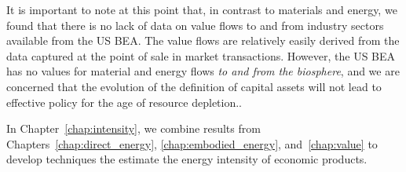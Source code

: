 It is important to note at this point that, in contrast to materials and energy,
we found that there is no lack of data on value flows
to and from industry sectors available 
from the US BEA. The value flows
are relatively easily derived from the 
data captured at the point of sale in market transactions. 
However, the US BEA has no values for material and energy flows 
\emph{to and from the biosphere}, and
we are concerned that the evolution of the definition of capital assets
will not lead to effective policy for the age of resource depletion..

In Chapter~\ref{chap:intensity}, 
we combine results from Chapters~\ref{chap:direct_energy}, 
\ref{chap:embodied_energy}, and~\ref{chap:value}
to develop techniques the estimate the energy intensity
of economic products.









%
%


